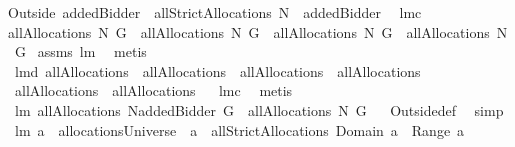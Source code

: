 \begin{isabellebody}
{\isacharparenleft}Outside{\isacharprime}\ {\isacharbraceleft}addedBidder{\isacharprime}{\isacharbraceright}{\isacharparenright}\ {\isacharbackquote}\ {\isacharparenleft}allStrictAllocations{\isacharprime}{\isacharprime}{\isacharprime}\ {\isacharparenleft}N\ {\isasymunion}\ {\isacharbraceleft}addedBidder{\isacharprime}{\isacharbraceright}{\isacharparenright}\ {\isasymOmega}{\isacharparenright}{\isachardoublequoteclose}\isanewline
{}\isamarkupfalse%
\ lm{}{}c{\isacharcolon}\ \isanewline
{\isachardoublequoteopen}allAllocations{\isacharprime}\ N\ G\ {\isacharequal}\ allAllocations{\isacharprime}{\isacharprime}\ N\ G\ {\isacharampersand}\ allAllocations{\isacharprime}{\isacharprime}\ N\ G\ {\isacharequal}\ allAllocations{\isacharprime}{\isacharprime}{\isacharprime}\ N\ G{\isachardoublequoteclose}\isanewline
%
\isadelimproof
%
\endisadelimproof
%
\isatagproof
{}\isamarkupfalse%
\ assms\ lm{}{}\ \isamarkupfalse%
\ metis%
\endisatagproof
{\isafoldproof}%
%
\isadelimproof
\isanewline
%
\endisadelimproof
{}\isamarkupfalse%
\ lm{}{}d{\isacharcolon}\ {\isachardoublequoteopen}allAllocations{\isacharprime}\ {\isacharequal}\ allAllocations{\isacharprime}{\isacharprime}\ {\isacharampersand}\ allAllocations{\isacharprime}{\isacharprime}\ {\isacharequal}\ allAllocations{\isacharprime}{\isacharprime}{\isacharprime}\isanewline
{\isacharampersand}\ allAllocations{\isacharprime}\ {\isacharequal}\ allAllocations{\isacharprime}{\isacharprime}{\isacharprime}{\isachardoublequoteclose}%
\isadelimproof
\ %
\endisadelimproof
%
\isatagproof
{}\isamarkupfalse%
\ lm{}{}c\ \isamarkupfalse%
\ metis%
\endisatagproof
{\isafoldproof}%
%
\isadelimproof
%
\endisadelimproof
\isanewline
{}\isamarkupfalse%
\ lm{}{}{\isacharcolon}\ {\isachardoublequoteopen}allAllocations{\isacharprime}\ {\isacharparenleft}N{\isacharminus}{\isacharbraceleft}addedBidder{\isacharprime}{\isacharbraceright}{\isacharparenright}\ G\ {\isasymsubseteq}\ allAllocations{\isacharprime}\ N\ G{\isachardoublequoteclose}%
\isadelimproof
\ %
\endisadelimproof
%
\isatagproof
{}\isamarkupfalse%
\ Outside{\isacharunderscore}def\ \isamarkupfalse%
\ simp%
\endisatagproof
{\isafoldproof}%
%
\isadelimproof
%
\endisadelimproof
\isanewline
\isanewline
{}\isamarkupfalse%
\ lm{}{}{\isacharcolon}\ {\isachardoublequoteopen}{\isacharparenleft}a\ {\isasymin}\ allocationsUniverse{\isacharparenright}\ {\isacharequal}\ {\isacharparenleft}a\ {\isasymin}\ allStrictAllocations{\isacharprime}{\isacharprime}{\isacharprime}\ {\isacharparenleft}Domain\ a{\isacharparenright}\ {\isacharparenleft}{\isasymUnion}\ Range\ a{\isacharparenright}{\isacharparenright}{\isachardoublequoteclose}\isanewline

\end{isabellebody}
